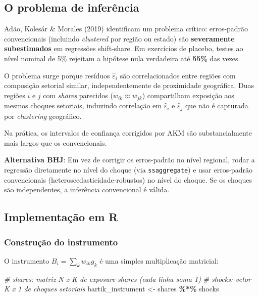 \documentclass[
]{article}
\newenvironment{Shaded}{\begin{snugshade}}{\end{snugshade}}
\newcommand{\CommentTok}[1]{\textcolor[rgb]{0.56,0.35,0.01}{\textit{#1}}}
\newcommand{\NormalTok}[1]{#1}
\newcommand{\OtherTok}[1]{\textcolor[rgb]{0.56,0.35,0.01}{#1}}
\newcommand{\SpecialCharTok}[1]{\textcolor[rgb]{0.81,0.36,0.00}{\textbf{#1}}}
\begin{document}
\subsection{O problema de inferência}\label{o-problema-de-inferuxeancia}

Adão, Kolesár \& Morales (2019) identificam um problema crítico: erros-padrão convencionais (incluindo \emph{clustered} por região ou estado) são \textbf{severamente subestimados} em regressões shift-share. Em exercícios de placebo, testes ao nível nominal de 5\% rejeitam a hipótese nula verdadeira até \textbf{55\%} das vezes.

O problema surge porque resíduos \(\hat{\varepsilon}_i\) são correlacionados entre regiões com composição setorial similar, independentemente de proximidade geográfica. Duas regiões \(i\) e \(j\) com \emph{shares} parecidos (\(w_{ik} \approx w_{jk}\)) compartilham exposição aos mesmos choques setoriais, induzindo correlação em \(\hat{\varepsilon}_i\) e \(\hat{\varepsilon}_j\) que não é capturada por \emph{clustering} geográfico.

Na prática, os intervalos de confiança corrigidos por AKM são substancialmente mais largos que os convencionais.

\textbf{Alternativa BHJ}: Em vez de corrigir os erros-padrão no nível regional, rodar a regressão diretamente no nível do choque (via \texttt{ssaggregate}) e usar erros-padrão convencionais (heteroscedasticidade-robustos) no nível do choque. Se os choques são independentes, a inferência convencional é válida.

\subsection{Implementação em R}\label{implementauxe7uxe3o-em-r}

\subsubsection{Construção do instrumento}\label{construuxe7uxe3o-do-instrumento}

O instrumento \(B_i = \sum_k w_{ik} g_k\) é uma simples multiplicação matricial:

\begin{Shaded}
\begin{Highlighting}[]
\CommentTok{\# shares: matriz N x K de exposure shares (cada linha soma 1)}
\CommentTok{\# shocks: vetor K x 1 de choques setoriais}
\NormalTok{bartik\_instrument }\OtherTok{\textless{}{-}}\NormalTok{ shares }\SpecialCharTok{\%*\%}\NormalTok{ shocks}
\end{Highlighting}
\end{Shaded}
\end{document}
